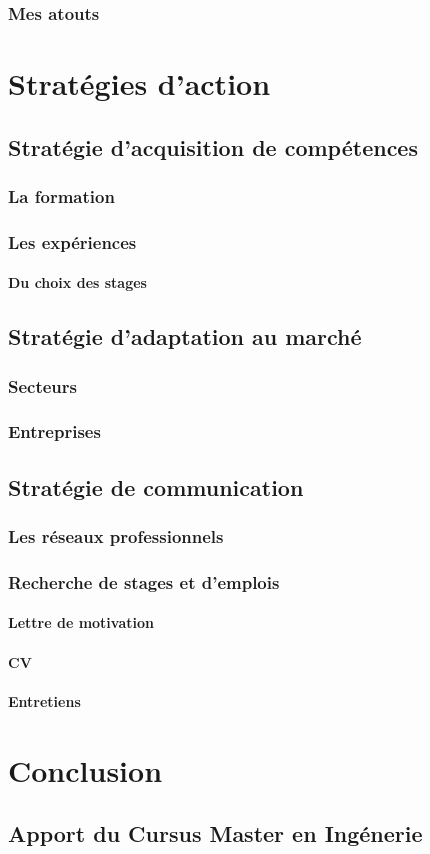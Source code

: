 \documentclass[a4paper,12pt, draft]{report}
\begin{document}
\section{Mes atouts}

\part{Stratégies d'action}

\chapter{Stratégie d'acquisition de compétences}
\section{La formation}
\section{Les expériences}
\subsection{Du choix des stages}

\chapter{Stratégie d'adaptation au marché}
\section{Secteurs}
\section{Entreprises}

\chapter{Stratégie de communication}
\section{Les réseaux professionnels}
\section{Recherche de stages et d'emplois}
\subsection{Lettre de motivation}
\subsection{CV}
\subsection{Entretiens}

\part{Conclusion}
\chapter{Apport du Cursus Master en Ingénerie}
\end{document}
